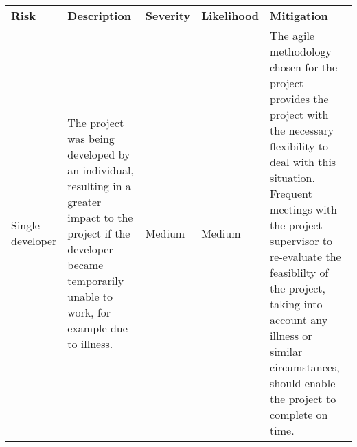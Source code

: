 \begin{table}[t]
  \begin{adjustbox}{rotate=90,center}
    \begin{tabularx}{\textheight}{|l|X|l|l|X|} \hline
      \textbf{Risk} & \textbf{Description} & \textbf{Severity} & \textbf{Likelihood} & \textbf{Mitigation} \\ \thickhline
      \makecell[l]{Single \\ developer} &
      The project was being developed by an individual, resulting in a greater impact to the project if the developer became temporarily unable to work, for example due to illness. &
      Medium &
      Medium &
      The agile methodology chosen for the project provides the project with the necessary flexibility to deal with this situation. Frequent meetings with the project supervisor to re-evaluate the feasiblilty of the project, taking into account any illness or similar circumstances, should enable the project to complete on time. \\ \hline

    \end{tabularx}
  \end{adjustbox}
\end{table}

